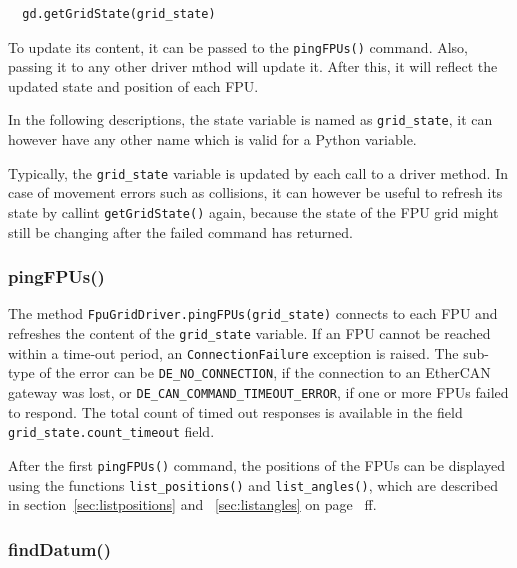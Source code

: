 \documentclass[11pt,a4paper]{report}
\begin{document}
\begin{verbatim}
  gd.getGridState(grid_state)
\end{verbatim}

To update its content, it can be passed to the \texttt{pingFPUs()}
command. Also, passing it to any other driver mthod will update
it. After this, it will reflect the updated state and position of each
FPU.

In the following descriptions, the state variable is named as
\texttt{grid\_state}, it can however have any other name which is
valid for a Python variable.

Typically, the \texttt{grid\_state} variable is updated by each call
to a driver method. In case of movement errors such as collisions, it
can however be useful to refresh its state by callint
\texttt{getGridState()} again, because the state of the FPU grid might
still be changing after the failed command has returned.

\subsubsection{pingFPUs()}
  The method
\texttt{FpuGridDriver.pingFPUs(grid\_state)} connects to each FPU and
refreshes the content of the \texttt{grid\_state} variable. If an FPU
cannot be reached within a time-out period, an
\texttt{ConnectionFailure} exception is raised. The sub-type of the
error can be \texttt{DE\_NO\_CONNECTION}, if the connection to an
EtherCAN gateway was lost, or
\texttt{DE\_CAN\_COMMAND\_TIMEOUT\_ERROR}, if one or more FPUs failed
to respond. The total count of timed out responses is available in the
field \texttt{grid\_state.count\_timeout} field.

After the first \texttt{pingFPUs()} command, the positions of the FPUs
can be displayed using the functions \texttt{list\_positions()} and
\texttt{list\_angles()}, which are described in
section~\ref{sec:listpositions} and ~\ref{sec:listangles} on
page~\pageref{sec:listpositions} ff.

\subsubsection{findDatum()}
  
\end{document}
